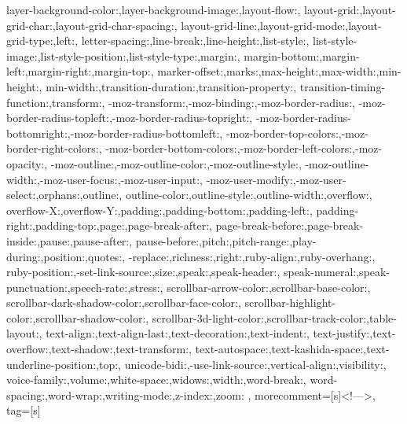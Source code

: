 {{		layer-background-color:,layer-background-image:,layout-flow:,
		layout-grid:,layout-grid-char:,layout-grid-char-spacing:,
		layout-grid-line:,layout-grid-mode:,layout-grid-type:,left:,
		letter-spacing:,line-break:,line-height:,list-style:,
		list-style-image:,list-style-position:,list-style-type:,margin:,
		margin-bottom:,margin-left:,margin-right:,margin-top:,
		marker-offset:,marks:,max-height:,max-width:,min-height:,
		min-width:,transition-duration:,transition-property:,
		transition-timing-function:,transform:,
		-moz-transform:,-moz-binding:,-moz-border-radius:,
		-moz-border-radius-topleft:,-moz-border-radius-topright:,
		-moz-border-radius-bottomright:,-moz-border-radius-bottomleft:,
		-moz-border-top-colors:,-moz-border-right-colors:,
		-moz-border-bottom-colors:,-moz-border-left-colors:,-moz-opacity:,
		-moz-outline:,-moz-outline-color:,-moz-outline-style:,
		-moz-outline-width:,-moz-user-focus:,-moz-user-input:,
		-moz-user-modify:,-moz-user-select:,orphans:,outline:,
		outline-color:,outline-style:,outline-width:,overflow:,
		overflow-X:,overflow-Y:,padding:,padding-bottom:,padding-left:,
		padding-right:,padding-top:,page:,page-break-after:,
		page-break-before:,page-break-inside:,pause:,pause-after:,
		pause-before:,pitch:,pitch-range:,play-during:,position:,quotes:,
		-replace:,richness:,right:,ruby-align:,ruby-overhang:,
		ruby-position:,-set-link-source:,size:,speak:,speak-header:,
		speak-numeral:,speak-punctuation:,speech-rate:,stress:,
		scrollbar-arrow-color:,scrollbar-base-color:,
		scrollbar-dark-shadow-color:,scrollbar-face-color:,
		scrollbar-highlight-color:,scrollbar-shadow-color:,
		scrollbar-3d-light-color:,scrollbar-track-color:,table-layout:,
		text-align:,text-align-last:,text-decoration:,text-indent:,
		text-justify:,text-overflow:,text-shadow:,text-transform:,
		text-autospace:,text-kashida-space:,text-underline-position:,top:,
		unicode-bidi:,-use-link-source:,vertical-align:,visibility:,
		voice-family:,volume:,white-space:,widows:,width:,word-break:,
		word-spacing:,word-wrap:,writing-mode:,z-index:,zoom:
	},  
	morecomment=[s]{<!--}{-->},
	tag=[s]
}

%

